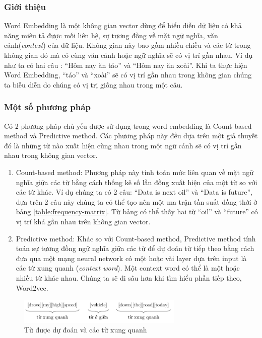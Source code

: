 \subsubsection{Giới thiệu}
Word Embedding là một không gian vector dùng để biểu diễn dữ liệu có khả năng miêu tả được mối liên hệ, sự tương đồng về mặt ngữ nghĩa, văn cảnh(\textit{context}) của dữ liệu. Không gian này bao gồm nhiều chiều và các từ trong không gian đó mà có cùng văn cảnh hoặc ngữ nghĩa sẽ có vị trí gần nhau. Ví dụ như ta có hai câu : ``Hôm nay ăn táo'' và ``Hôm nay ăn xoài''. Khi ta thực hiện Word Embedding, ``táo'' và ``xoài'' sẽ có vị trí gần nhau trong không gian chúng ta biễu diễn do chúng có vị trị giống nhau trong một câu. \cite{webpage12}

\subsubsection{Một số phương pháp}
Có 2 phương pháp chủ yếu được sử dụng trong word embedding là Count based method và Predictive method. Các phương pháp này đều dựa trên một giả thuyết đó là những từ nào xuất hiện cùng nhau trong một ngữ cảnh sẽ có vị trí gần nhau trong không gian vector. \cite{webpage12}
\begin{enumerate}
    \item Count-based method: Phương pháp này tính toán mức liên quan về mặt ngữ nghĩa giữa các từ bằng cách thống kê số lần đồng xuất hiện của một từ so với các từ khác. Ví dụ chúng ta có 2 câu: ``Data is next oil'' và ``Data is future'', dựa trên 2 câu này chúng ta có thể tạo nên một ma trận tần suất đồng thời ở bảng \ref{table:frequency-matrix}. Từ bảng có thể thấy hai từ ``oil'' và ``future'' có vị trí khá gần nhau trên không gian vector.
    \item Predictive method: Khác so với Count-based method, Predictive method tính toán sự tương đồng ngữ nghĩa giữa các từ để dự đoán từ tiếp theo bằng cách đưa qua một mạng neural network có một hoặc vài layer dựa trên input là các từ xung quanh (\textit{context word}). Một context word có thể là một hoặc nhiều từ khác nhau. Chúng ta sẽ đi sâu hơn khi tìm hiểu phần tiếp theo, Word2vec.
\end{enumerate}

\begin{figure}[htb]
    \centering
    \includegraphics[width=0.7\textwidth]{tikz_image/predictive_method.pdf}
    \caption{Từ được dự đoán và các từ xung quanh}
    \label{figure:predictive-method}
\end{figure}

